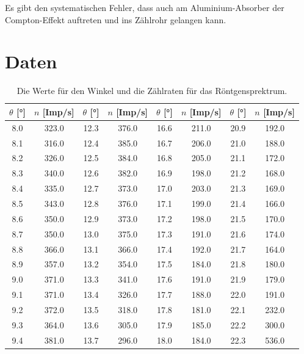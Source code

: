\documentclass[titlepage = firstcover]{scrartcl}
\begin{document}
        Es gibt den systematischen Fehler, dass auch am Aluminium-Absorber der Compton-Effekt auftreten und ins Zählrohr gelangen kann.
      
      \section{Daten}
        \begin{table}
          \centering
          \caption{Die Werte für den Winkel und die Zählraten für das Röntgensprektrum.}
          \label{tab:emission}
          \begin{tabular}{c c c c c c c c}
            \toprule
            $\theta$ [°] & $n$ [Imp/s] & $\theta$ [°] & $n$ [Imp/s] & $\theta$ [°] & $n$ [Imp/s] & $\theta$ [°] & $n$ [Imp/s] \\
            \midrule                                                         
            8.0	 & 323.0 & 12.3 & 376.0 & 16.6 & 211.0 &  20.9 & 192.0\\ 
            8.1	 & 316.0 & 12.4 & 385.0 & 16.7 & 206.0 &  21.0 & 188.0\\ 
            8.2	 & 326.0 & 12.5 & 384.0 & 16.8 & 205.0 &  21.1 & 172.0\\ 
            8.3	 & 340.0 & 12.6 & 382.0 & 16.9 & 198.0 &  21.2 & 168.0\\ 
            8.4	 & 335.0 & 12.7 & 373.0 & 17.0 & 203.0 &  21.3 & 169.0\\ 
            8.5	 & 343.0 & 12.8 & 376.0 & 17.1 & 199.0 &  21.4 & 166.0\\ 
            8.6	 & 350.0 & 12.9 & 373.0 & 17.2 & 198.0 &  21.5 & 170.0\\ 
            8.7	 & 350.0 & 13.0 & 375.0 & 17.3 & 191.0 &  21.6 & 174.0\\ 
            8.8	 & 366.0 & 13.1 & 366.0 & 17.4 & 192.0 &  21.7 & 164.0\\ 
            8.9	 & 357.0 & 13.2 & 354.0 & 17.5 & 184.0 &  21.8 & 180.0\\ 
            9.0	 & 371.0 & 13.3 & 341.0 & 17.6 & 191.0 &  21.9 & 179.0\\ 
            9.1	 & 371.0 & 13.4 & 326.0 & 17.7 & 188.0 &  22.0 & 191.0\\ 
            9.2	 & 372.0 & 13.5 & 318.0 & 17.8 & 181.0 &  22.1 & 232.0\\ 
            9.3	 & 364.0 & 13.6 & 305.0 & 17.9 & 185.0 &  22.2 & 300.0\\ 
            9.4	 & 381.0 & 13.7 & 296.0 & 18.0 & 184.0 &  22.3 & 536.0\\  

\end{tabular}
\end{table}
\end{document}
